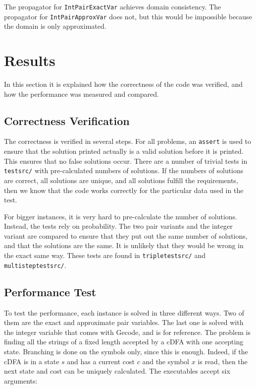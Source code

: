 \documentclass[a4paper,11pt]{article}
\begin{document}
The propagator for \texttt{IntPairExactVar} achieves domain consistency. The propagator for \texttt{IntPairApproxVar} does not, but this would be impossible because the domain is only approximated.

\section{Results}
In this section it is explained how the correctness of the code was verified, and how the performance was measured and compared.

\subsection{Correctness Verification}
The correctness is verified in several steps. For all problems, an \texttt{assert} is used to ensure that the solution printed actually is a valid solution before it is printed. This ensures that no false solutions occur. There are a number of trivial tests in \texttt{testsrc/} with pre-calculated numbers of solutions. If the numbers of solutions are correct, all solutions are unique, and all solutions fulfill the requirements, then we know that the code works correctly for the particular data used in the test.

For bigger instances, it is very hard to pre-calculate the number of solutions. Instead, the tests rely on probability. The two pair variants and the integer variant are compared to ensure that they put out the same number of solutions, and that the solutions are the same. It is unlikely that they would be wrong in the exact same way. These tests are found in \texttt{tripletestsrc/} and \texttt{multisteptestsrc/}.

\subsection{Performance Test}
\label{sec:performancetest}
To test the performance, each instance is solved in three different ways. Two of them are the exact and approximate pair variables. The last one is solved with the integer variable that comes with Gecode, and is for reference. The problem is finding all the strings of a fixed length accepted by a cDFA with one accepting state. Branching is done on the symbols only, since this is enough. Indeed, if the cDFA is in a state $s$ and has a current cost $c$ and the symbol $x$ is read, then the next state and cost can be uniquely calculated. The executables accept six arguments: 
\end{document}
